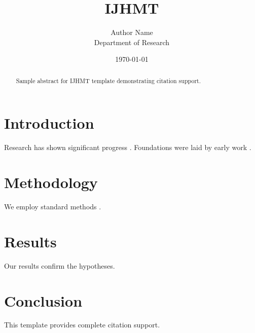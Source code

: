 ﻿\documentclass{elsarticle}
\title{IJHMT}
\author{Author Name \\ \small Department of Research}
\date{\today}
\begin{document}
\maketitle

\begin{abstract}
Sample abstract for IJHMT template demonstrating citation support.
\end{abstract}

\section{Introduction}
Research has shown significant progress \citep{einstein1905}. Foundations were laid by early work \citep{turing1950}.

\section{Methodology}
We employ standard methods \citep{knuth1984}.

\section{Results}
Our results confirm the hypotheses.

\section{Conclusion}
This template provides complete citation support.



\end{document}
